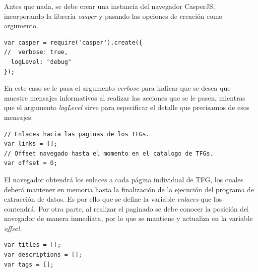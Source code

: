 \lhead{\emph{\ChapterTwo{}}}
\label{code-retrieval}
\lstset{
   language=Javascript
}

Antes que nada, se debe crear una instancia del navegador CasperJS, incorporando la librería \textit{casper} y pasando las opciones de creación como argumento.

\begin{center}
\begin{minipage}{\linewidth}
\begin{lstlisting}[caption=Creación del navegador CasperJS.]
var casper = require('casper').create({
//  verbose: true,
  logLevel: "debug"
});
\end{lstlisting}
\end{minipage}
\end{center}




En este caso se le pasa el argumento \textit{verbose} para indicar que se desea que muestre mensajes informativos al realizar las acciones que se le pasen, mientras que el argumento \textit{logLevel} sirve para especificar el detalle que precisamos de esos mensajes. %

\begin{center}
\begin{minipage}{\linewidth}
\begin{lstlisting}[caption=Estructuras de datos para la navegación por la página.]
// Enlaces hacia las paginas de los TFGs.
var links = [];
// Offset navegado hasta el momento en el catalogo de TFGs.
var offset = 0;
\end{lstlisting}
\end{minipage}
\end{center}

El navegador obtendrá los enlaces a cada página individual de TFG, los cuales deberá mantener en memoria hasta la finalización de la ejecución del programa de extracción de datos.
Es por ello que se define la variable \textit{enlaces} que los contendrá. Por otra parte, al realizar el paginado se debe conocer la posición del navegador de manera inmediata, por lo que se mantiene y actualiza en la variable \textit{offset}. %

\begin{center}
\begin{minipage}{\linewidth}
\begin{lstlisting}[caption=Estructuras de datos para las características de cada TFG.]
var titles = [];
var descriptions = [];
var tags = [];
\end{lstlisting}
\end{minipage}
\end{center}

